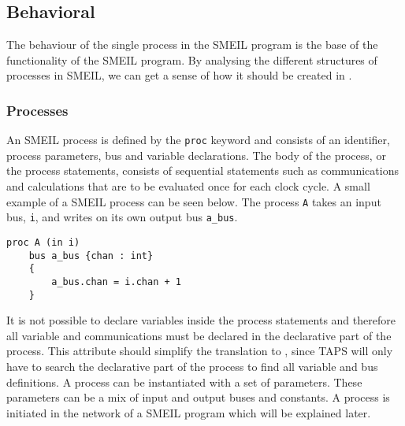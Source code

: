 
\subsection{Behavioral}
The behaviour of the single process in the SMEIL program is the base of the functionality of the SMEIL program. By analysing the different structures of processes in SMEIL, we can get a sense of how it should be created in \cspm.
\subsubsection{Processes}

An SMEIL process is defined by the \texttt{proc} keyword and consists of an identifier, process parameters, bus and variable declarations. The body of the process, or the process statements, consists of sequential statements such as communications and calculations that are to be evaluated once for each clock cycle. A small example of a SMEIL process can be seen below. The process \texttt{A} takes an input bus, \texttt{i}, and writes on its own output bus \texttt{a\_bus}.
\begin{verbatim}
proc A (in i)
    bus a_bus {chan : int}
    {
        a_bus.chan = i.chan + 1
    }
\end{verbatim}

It is not possible to declare variables inside the process statements and therefore all variable and communications must be declared in the declarative part of the process. This attribute should simplify the translation to \cspm, since TAPS will only have to search the declarative part of the process to find all variable and bus definitions.
A process can be instantiated with a set of parameters. These parameters can be a mix of input and output buses and constants. A process is initiated in the network of a SMEIL program which will be explained later.\\


